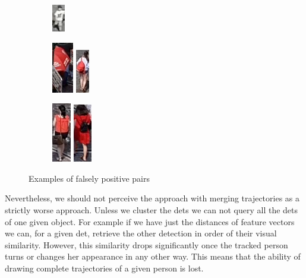 \begin{figure}
\begin{subfigure}[b]{0.3\textwidth}
         \includegraphics[height=\fpheight]{img/fp_3_b.png}
    \end{subfigure}
    \begin{subfigure}[b]{0.3\textwidth}
         \centering
         \includegraphics[height=\fpheight]{img/fp_4_a.png}
         \includegraphics[height=\fpheight]{img/fp_4_b.png}
    \end{subfigure}
    \begin{subfigure}[b]{0.3\textwidth}
         \centering
         \includegraphics[height=\fpheight]{img/fp_5_a.png}
         \includegraphics[height=\fpheight]{img/fp_5_b.png}
    \end{subfigure}
    \caption{Examples of falsely positive pairs}
    \label{fig:fp_pairs}
\end{figure}

Nevertheless, we should not perceive the approach with merging trajectories as a strictly worse approach. Unless we cluster the \glspl{det} we can not query all the \glspl{det} of one given object. For example if we have just the distances of feature vectors we can, for a given \gls{det}, retrieve the other detection in order of their visual similarity. However, this similarity drops significantly once the tracked person turns or changes her appearance in any other way. This means that the ability of drawing complete trajectories of a given person is lost.

